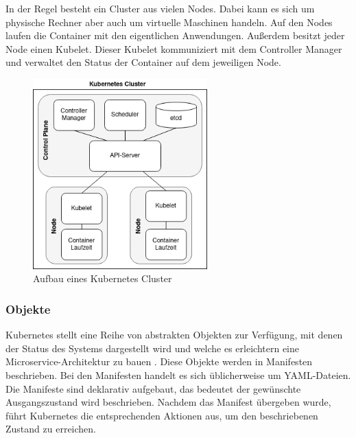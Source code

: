 In der Regel besteht ein Cluster aus vielen Nodes. Dabei kann es sich um physische Rechner aber auch um virtuelle Maschinen handeln. Auf den Nodes laufen die Container mit den eigentlichen Anwendungen. Außerdem besitzt jeder Node einen Kubelet. Dieser Kubelet kommuniziert mit dem Controller Manager und verwaltet den Status der Container auf dem jeweiligen Node.

\begin{figure}[H] 
    \centering
    \includegraphics[width=0.60\textwidth]{figures/KubernetesCluster.png}
    \caption{Aufbau eines Kubernetes Cluster}
\end{figure}

\subsubsection{Objekte}

Kubernetes stellt eine Reihe von abstrakten Objekten zur Verfügung, mit denen der Status des Systems dargestellt wird und welche es erleichtern eine Microservice-Architektur zu bauen \parencite[vgl.][S. 13]{hightowerKubernetes2018}. Diese Objekte werden in Manifesten beschrieben. Bei den Manifesten handelt es sich üblicherweise um YAML-Dateien. Die Manifeste sind deklarativ aufgebaut, das bedeutet der gewünschte Ausgangszustand wird beschrieben. Nachdem das Manifest übergeben wurde, führt Kubernetes die entsprechenden Aktionen aus, um den beschriebenen Zustand zu erreichen.


